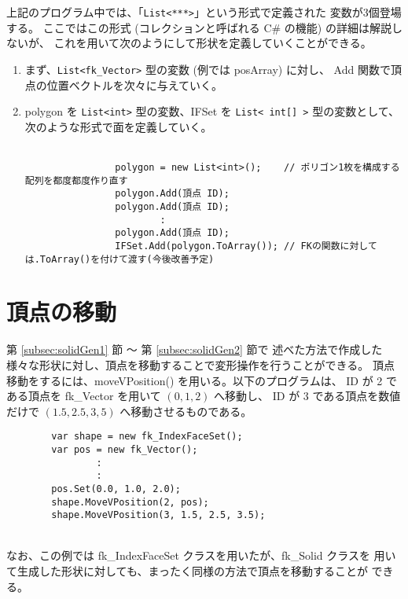 上記のプログラム中では、「\verb+List<***>+」という形式で定義された
変数が3個登場する。
ここではこの形式 (コレクションと呼ばれる C# の機能) の詳細は解説しないが、
これを用いて次のようにして形状を定義していくことができる。
\begin{enumerate}
 \item まず、\verb+List<fk_Vector>+ 型の変数 (例では posArray) に対し、
	Add 関数で頂点の位置ベクトルを次々に与えていく。

 \item polygon を \verb+List<int>+ 型の変数、IFSet を
	\verb+List< int[] >+ 型の変数として、
	次のような形式で面を定義していく。\\ ~ \\
	\begin{screen}
	\begin{verbatim}
                polygon = new List<int>();    // ポリゴン1枚を構成する配列を都度都度作り直す
                polygon.Add(頂点 ID);
                polygon.Add(頂点 ID);
                        :
                polygon.Add(頂点 ID);
                IFSet.Add(polygon.ToArray()); // FKの関数に対しては.ToArray()を付けて渡す(今後改善予定)
	\end{verbatim}
	\end{screen}
\end{enumerate}

\section{頂点の移動} \label{subsec:movevertex}
第 \ref{subsec:solidGen1} 節 〜 第 \ref{subsec:solidGen2} 節で
述べた方法で作成した
様々な形状に対し、頂点を移動することで変形操作を行うことができる。
頂点移動をするには、moveVPosition() を用いる。以下のプログラムは、
ID が 2 である頂点を fk\_Vector を用いて \((0, 1, 2)\) へ移動し、
ID が 3 である頂点を数値だけで \((1.5, 2.5, 3,5)\) へ移動させるものである。
\\
\begin{breakbox}
\begin{verbatim}
        var shape = new fk_IndexFaceSet();
        var pos = new fk_Vector();
                :
                :
        pos.Set(0.0, 1.0, 2.0);
        shape.MoveVPosition(2, pos);
        shape.MoveVPosition(3, 1.5, 2.5, 3.5);
\end{verbatim}
\end{breakbox}
~ \\
なお、この例では fk\_IndexFaceSet クラスを用いたが、fk\_Solid クラスを
用いて生成した形状に対しても、まったく同様の方法で頂点を移動することが
できる。


